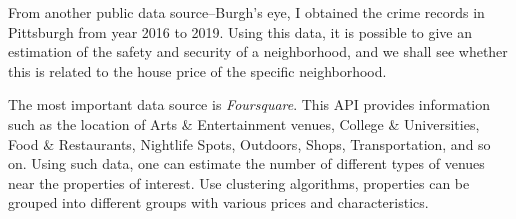 \documentclass[11pt,notitlepage]{article}
\begin{document}
From another public data source--Burgh's eye, I obtained the crime records
in Pittsburgh from year 2016 to 2019. Using this data, it is possible to give
an estimation of the safety and security of a neighborhood, and we shall see
whether this is related to the house price of the specific neighborhood.

The most important data source is \textit{Foursquare}.
This API provides information such as the location of
Arts \& Entertainment venues, College \& Universities, Food \& Restaurants,
Nightlife Spots, Outdoors, Shops, Transportation, and so on.
Using such data, one can estimate the number of different types of venues
near the properties of interest.
Use clustering algorithms, properties can be grouped into different groups
with various prices and characteristics.
\end{document}

